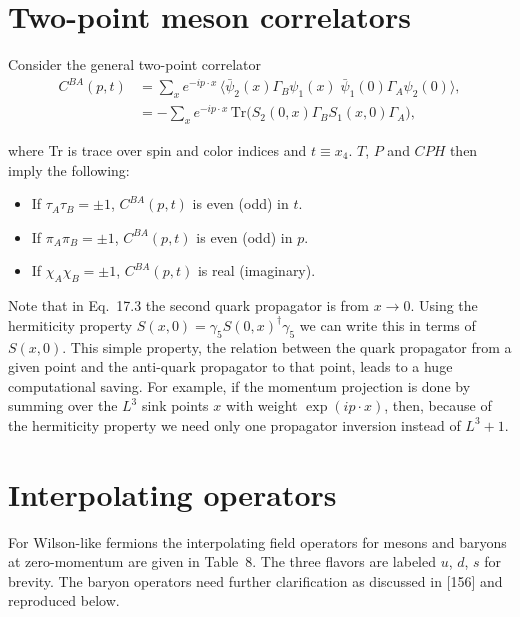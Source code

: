 \section{Two-point meson correlators}

Consider the general two-point correlator
\begin{equation}
\begin{aligned}
C^{BA}(p,t) &= \sum_x e^{-ip\cdot x}\,
   \langle \bar{\psi}_2(x)\Gamma_B\psi_1(x)\;\bar{\psi}_1(0)\Gamma_A\psi_2(0)\rangle ,\\
&= -\sum_x e^{-ip\cdot x}\,
   \mathrm{Tr}\big(S_2(0,x)\Gamma_B S_1(x,0)\Gamma_A\big) ,
\end{aligned}
\end{equation}

where Tr is trace over spin and color indices and $t \equiv x_4$.  $T$, $P$ and
$CPH$ then imply the following:
\begin{itemize}
\item If $\tau_A\tau_B = \pm 1$, $C^{BA}(p,t)$ is even (odd) in $t$.
\item If $\pi_A\pi_B = \pm 1$, $C^{BA}(p,t)$ is even (odd) in $p$.
\item If $\chi_A\chi_B = \pm 1$, $C^{BA}(p,t)$ is real (imaginary).
\end{itemize}

Note that in Eq.~17.3 the second quark propagator is from $x \to 0$.  Using the
hermiticity property $S(x,0) = \gamma_5 S(0,x)^\dagger \gamma_5$ we can write
this in terms of $S(x,0)$.  This simple property, the relation between the
quark propagator from a given point and the anti-quark propagator to that
point, leads to a huge computational saving.  For example, if the momentum
projection is done by summing over the $L^3$ sink points $x$ with weight
$\exp(ip\cdot x)$, then, because of the hermiticity property we need only one
propagator inversion instead of $L^3+1$.

\section{Interpolating operators}

For Wilson-like fermions the interpolating field operators for mesons and
baryons at zero-momentum are given in Table~8.  The three flavors are labeled
$u$, $d$, $s$ for brevity.  The baryon operators need further clarification as
discussed in [156] and reproduced below.

